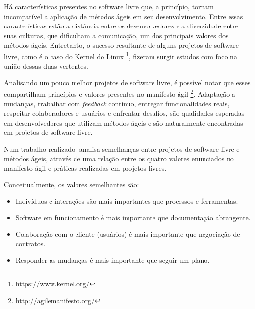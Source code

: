Há características presentes no software livre que, a princípio, tornam incompatível a aplicação de métodos ágeis em seu desenvolvimento. Entre essas características estão a distância entre os desenvolvedores e a diversidade entre suas culturas, que dificultam a comunicação, um dos principais valores dos métodos ágeis. Entretanto, o sucesso resultante de alguns projetos de software livre, como é o caso do Kernel do Linux \footnote{\url{https://www.kernel.org/}}, fizeram surgir estudos com foco na união dessas duas vertentes.

Analisando um pouco melhor projetos de software livre, é possível notar que esses compartilham princípios e valores presentes no manifesto ágil \footnote{\url{http://agilemanifesto.org/}}. Adaptação a mudanças, trabalhar com \textit{feedback} contínuo, entregar funcionalidades reais, respeitar colaboradores e usuários e enfrentar desafios, são qualidades esperadas em desenvolvedores que utilizam métodos ágeis e são naturalmente encontradas em projetos de software livre.

Num trabalho realizado,  analisa semelhanças entre projetos de software livre e métodos ágeis, através de uma relação entre os quatro valores enunciados no manifesto ágil e práticas realizadas em projetos livres. 

%
%
Conceitualmente, os valores semelhantes são:

\begin{itemize}

\item {Indivíduos e interações são mais importantes que processos e ferramentas.}

\item {Software em funcionamento é mais importante que documentação abrangente.}

\item {Colaboração com o cliente (usuários) é mais importante que negociação de contratos.}

\item {Responder às mudanças é mais importante que seguir um plano.}

\end{itemize}

